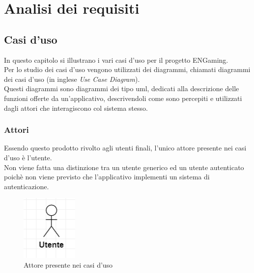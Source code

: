 
\chapter{Analisi dei requisiti}
\label{cap:analisi-requisiti}

\section{Casi d'uso}

In questo capitolo si illustrano i vari casi d'uso per il progetto ENGaming.\\
Per lo studio dei casi d'uso vengono utilizzati dei diagrammi, chiamati diagrammi dei casi d'uso (in inglese \emph{Use Case Diagram}).\\
Questi diagrammi sono diagrammi dei tipo \gls{uml}, dedicati alla descrizione delle funzioni offerte da un'applicativo, descrivendoli come sono percepiti e utilizzati dagli attori che interagiscono col sistema stesso.

\subsection{Attori}

Essendo questo prodotto rivolto agli utenti finali, l'unico attore presente nei casi d'uso è l'utente.\\
Non viene fatta una distinzione tra un utente generico ed un utente autenticato poichè non viene previsto che l'applicativo implementi un sistema di autenticazione.

\begin{figure}[h]
    \centering
    \includegraphics{images/usecase/attore.png}
    \caption{Attore presente nei casi d'uso}
    \label{fig:attore}
\end{figure}

